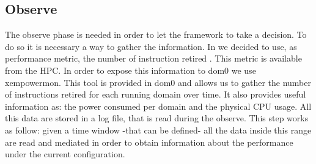 \subsection{Observe}
The observe phase is needed in order to let the framework to take a decision. To do so it is necessary a way to gather the information.
In \xempupil we decided to use, as performance metric, the number of instruction retired . This metric is available from the HPC. In order to expose this information to dom0 we use xempowermon. This tool is provided in dom0 and allows us to gather the number of instructions retired for each running domain over time. It also provides useful information as: the power consumed per domain and the physical CPU usage.
All this data are stored in a log file, that is read during the observe. This step works as follow: given a time window -that can be defined- all the data inside this range are read and mediated in order to obtain information about the performance under the current configuration.






